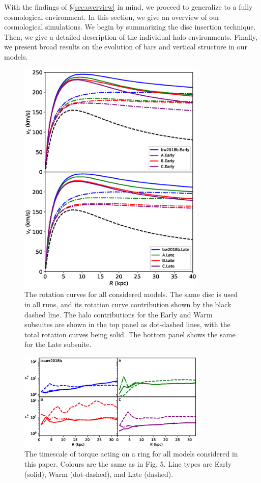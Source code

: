 With the findings of \S\ref{sec:overview} in mind, we proceed to generalize to a fully cosmological environment. In this section, we give an overview of our cosmological simulations. We begin by summarizing the disc insertion technique. Then, we give a detailed description of the individual halo environments. Finally, we present broad results on the evolution of bars and vertical structure in our models.


\begin{figure}
	\centering
	\includegraphics[width=0.8\textwidth]{../figures/rotation_curve.eps}
	\caption{The rotation curves for all considered models. The same disc is used in all runs, and its rotation curve contribution shown by the black dashed line. The halo contributions  for the Early and Warm subsuites are shown in the top panel as dot-dashed lines, with the total rotation curves being solid. The bottom panel shows the same for the Late subsuite.} \label{fig:rotation_curves}
\end{figure}




\begin{figure}
	\centering
	\includegraphics[width=0.8\textwidth]{../figures/timescale.eps}\caption{The timescale of torque acting on a ring for all models considered in this paper. Colours are the same as in Fig. 5. Line types are Early (solid), Warm (dot-dashed), and Late (dashed).} \label{fig:ratio_freqs}
\end{figure}

